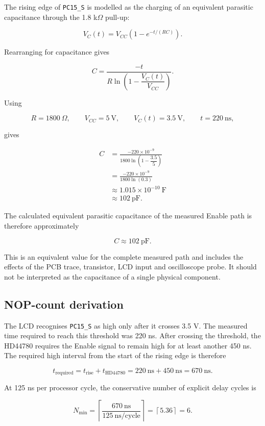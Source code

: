 \documentclass[11pt]{article}
\begin{document}
The rising edge of \texttt{PC15\_S} is modelled as the charging of an
equivalent parasitic capacitance through the 1.8 k$\Omega$ pull-up:

\[
V_C(t)=V_{CC}\left(1-e^{-t/(RC)}\right).
\]

Rearranging for capacitance gives

\[
C=
\frac{-t}
{R\ln\left(1-\dfrac{V_C(t)}{V_{CC}}\right)}.
\]

Using

\[
R=1800~\Omega,\qquad
V_{CC}=5~\mathrm{V},\qquad
V_C(t)=3.5~\mathrm{V},\qquad
t=220~\mathrm{ns},
\]

gives

\[
\begin{aligned}
C &=
\frac{-220\times10^{-9}}
{1800\ln\left(1-\dfrac{3.5}{5}\right)} \\[4pt]
&=
\frac{-220\times10^{-9}}
{1800\ln(0.3)} \\[4pt]
&\approx 1.015\times10^{-10}~\mathrm{F} \\[4pt]
&\approx 102~\mathrm{pF}.
\end{aligned}
\]

The calculated equivalent parasitic capacitance of the measured Enable path is
therefore approximately

\[
\boxed{C\approx102~\mathrm{pF}}.
\]

This is an equivalent value for the complete measured path and includes the
effects of the PCB trace, transistor, LCD input and oscilloscope probe. It
should not be interpreted as the capacitance of a single physical component.

\subsection{NOP-count derivation}

The LCD recognises \texttt{PC15\_S} as high only after it crosses 3.5 V.
The measured time required to reach this threshold was 220 ns. After crossing
the threshold, the HD44780 requires the Enable signal to remain high for at
least another 450 ns. The required high interval from the start of the rising
edge is therefore

\[
t_{\mathrm{required}}
=
t_{\mathrm{rise}}+t_{\mathrm{HD44780}}
=
220~\mathrm{ns}+450~\mathrm{ns}
=
670~\mathrm{ns}.
\]

At 125 ns per processor cycle, the conservative number of explicit delay
cycles is

\[
N_{\min}
=
\left\lceil
\frac{670~\mathrm{ns}}{125~\mathrm{ns/cycle}}
\right\rceil
=
\left\lceil5.36\right\rceil
=
6.
\]
\end{document}
